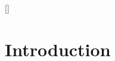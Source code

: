 \documentclass[draft, {\secondLanguage}, english]{volcanica-template}
\author[{{\affiliation{1}}}] 				%
{\orcidaffil{0000.0000.0000.0000}~			%
Person A. G. Persondóttir	 				%
\Email{email@address.io}}	 		    	%
\author[{{\affiliation{2}}}] 				%
{\orcidaffil{0000.0000.0000.0000}~			%
Someone Else}						    	%
\author[{{\affiliation{3}}}] 				%
{\orcidaffil{0000.0000.0000.0000}~			%
Another S. Cientist}						%
\affil[{{\affiliation{1}}}]{					%
The first affiliation.
}
\affil[{{\affiliation{2}}}]{					%
A second affiliation; note how it ends in a full stop.
}
\affil[{{\affiliation{3}}}]{					%
Somewhere else.}
\begin{document}
\FrontMatter{\protect{\lipsum[45]}}
[] %
{					
}

\hypertarget{introduction}{%
\section{Introduction}\label{introduction}}		%

\Contributions{%
}
%
\Acknowledgments{%
}
%
\DataAvailability{%
}
%
\EndMatter
\end{document}
